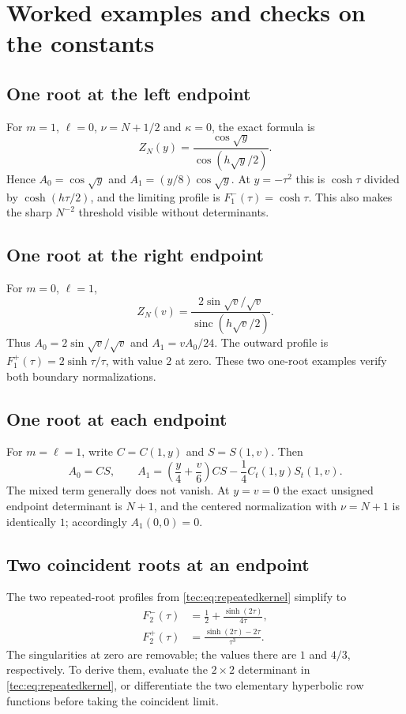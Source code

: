 \documentclass[11pt,a4paper]{article}
\numberwithin{equation}{section}
\theoremstyle{definition}
\theoremstyle{remark}
\newcommand{\sinc}{\operatorname{sinc}}
\begin{document}
\section{Worked examples and checks on the constants}\label{tec:sec:examples}
\subsection{One root at the left endpoint}
For $m=1$, $\ell=0$, $\nu=N+1/2$ and $\kappa=0$, the exact formula is
\[
 Z_N(y)=\frac{\cos\sqrt y}{\cos(h\sqrt y/2)}.
\]
Hence $A_0=\cos\sqrt y$ and $A_1=(y/8)\cos\sqrt y$.
At $y=-\tau^2$ this is $\cosh\tau$ divided by
$\cosh(h\tau/2)$, and the limiting profile is $F_1^-(\tau)=\cosh\tau$.
This also makes the sharp $N^{-2}$ threshold visible without determinants.

\subsection{One root at the right endpoint}
For $m=0$, $\ell=1$,
\[
 Z_N(v)=\frac{2\sin\sqrt v/\sqrt v}{\sinc(h\sqrt v/2)}.
\]
Thus $A_0=2\sin\sqrt v/\sqrt v$ and $A_1=vA_0/24$.
The outward profile is $F_1^+(\tau)=2\sinh\tau/\tau$, with value $2$
at zero. These two one-root examples verify both boundary normalizations.

\subsection{One root at each endpoint}
For $m=\ell=1$, write $C=C(1,y)$ and $S=S(1,v)$. Then
\begin{equation}\label{tec:eq:11}
 A_0=CS,\qquad
 A_1=\left(\frac y4+\frac v6\right)CS
                  -\frac14 C_t(1,y)S_t(1,v).
\end{equation}
The mixed term generally does not vanish. At $y=v=0$ the exact
unsigned endpoint determinant is $N+1$, and the centered normalization
with $\nu=N+1$ is identically $1$; accordingly $A_1(0,0)=0$.

\subsection{Two coincident roots at an endpoint}
The two repeated-root profiles from \eqref{tec:eq:repeatedkernel} simplify to
\begin{align}
 F_2^-(\tau)&=\frac12+\frac{\sinh(2\tau)}{4\tau},\label{tec:eq:F2minus}\\
 F_2^+(\tau)&=\frac{\sinh(2\tau)-2\tau}{\tau^3}.\label{tec:eq:F2plus}
\end{align}
The singularities at zero are removable; the values there are $1$ and
$4/3$, respectively. To derive them, evaluate the $2\times2$ determinant
in \eqref{tec:eq:repeatedkernel}, or differentiate the two elementary
hyperbolic row functions before taking the coincident limit.
\end{document}
